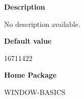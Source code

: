  
{\bf Description}

No description available.

 
{\bf Default value}

16711422

 
{\bf Home Package}

WINDOW-BASICS

